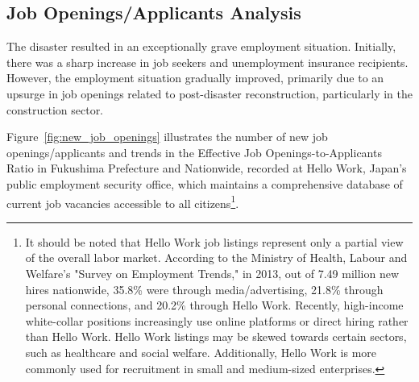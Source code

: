 \documentclass[a4paper,12pt]{article}
\begin{document}



\clearpage
\subsection{Job Openings/Applicants Analysis}
\label{sec4.1}

The disaster resulted in an exceptionally grave employment situation. Initially, there was a sharp increase in job seekers and unemployment insurance recipients. However, the employment situation gradually improved, primarily due to an upsurge in job openings related to post-disaster reconstruction, particularly in the construction sector. 


Figure~\ref{fig:new_job_openings} illustrates the number of new job openings/applicants and trends in the Effective Job Openings-to-Applicants Ratio in Fukushima Prefecture and Nationwide, recorded at Hello Work, Japan’s public employment security office, which maintains a comprehensive database of current job vacancies accessible to all citizens\footnote{It should be noted that Hello Work job listings represent only a partial view of the overall labor market. According to the Ministry of Health, Labour and Welfare's "Survey on Employment Trends," in 2013, out of 7.49 million new hires nationwide, 35.8\% were through media/advertising, 21.8\% through personal connections, and 20.2\% through Hello Work. Recently, high-income white-collar positions increasingly use online platforms or direct hiring rather than Hello Work. Hello Work listings may be skewed towards certain sectors, such as healthcare and social welfare. Additionally, Hello Work is more commonly used for recruitment in small and medium-sized enterprises.}. 

\end{document}
